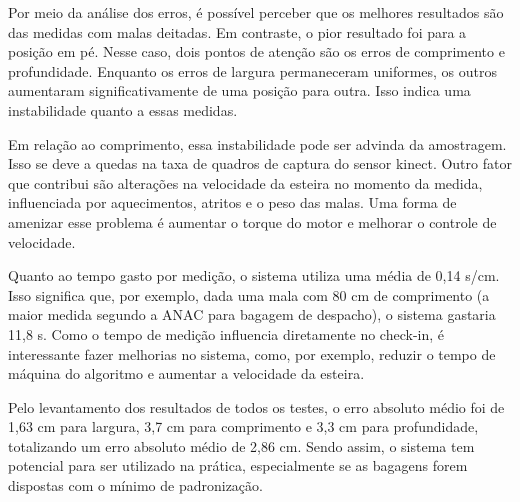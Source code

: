 \begin{table}[h!]
\centering
{}
\caption{Comparação dos MAEs em diferentes posições}
\label{tab:resulmoResultadoDiferetesPosicoes}
\end{table}

    Por meio da análise dos erros, é possível perceber que os melhores resultados são das medidas com malas deitadas. Em contraste, o pior resultado foi para a posição em pé. Nesse caso, dois pontos de atenção são os erros de comprimento e profundidade. Enquanto os erros de largura permaneceram uniformes, os outros aumentaram significativamente de uma posição para outra. Isso indica uma instabilidade quanto a essas medidas.
    
    Em relação ao comprimento, essa instabilidade pode ser advinda da amostragem. Isso se deve a quedas na taxa de quadros de captura do sensor kinect. Outro fator que contribui são alterações na velocidade da esteira no momento da medida, influenciada por aquecimentos, atritos e o peso das malas. Uma forma de amenizar esse problema é aumentar o torque do motor e melhorar o controle de velocidade.
    
    Quanto ao tempo gasto por medição, o sistema utiliza uma média de 0,14 s/cm. Isso significa que, por exemplo, dada uma mala com 80 cm de comprimento (a maior medida segundo a ANAC para bagagem de despacho), o sistema gastaria 11,8 s. Como o tempo de medição influencia diretamente no check-in, é interessante fazer melhorias no sistema, como, por exemplo, reduzir o tempo de máquina do algoritmo e aumentar a velocidade da esteira.
    
    Pelo levantamento dos resultados de todos os testes, o erro absoluto médio foi de 1,63 cm para largura, 3,7 cm para comprimento e 3,3 cm para profundidade, totalizando um erro absoluto médio de 2,86 cm. Sendo assim, o sistema tem potencial para ser utilizado na prática, especialmente se as bagagens forem dispostas com o mínimo de padronização. 

